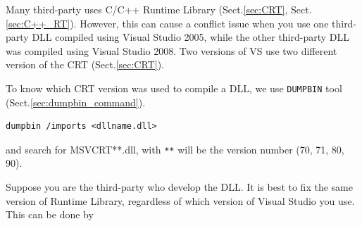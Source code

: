 Many third-party uses C/C++ Runtime Library (Sect.\ref{sec:CRT},
Sect.\ref{sec:C++_RT}). However, this can cause a conflict issue when you use
one third-party DLL compiled using Visual Studio 2005, while the other
third-party DLL was compiled using Visual Studio 2008. Two versions of VS use
two different version of the CRT (Sect.\ref{sec:CRT}).

To know which CRT version was used to compile a DLL, we use \verb!DUMPBIN! tool (Sect.\ref{sec:dumpbin_command}). 
\begin{verbatim}
dumpbin /imports <dllname.dll>
\end{verbatim}
and search for MSVCRT**.dll, with \verb!**! will be the version number (70, 71, 80, 90). 


Suppose you are the third-party who develop the DLL. It is best to fix the same 
version of Runtime Library, regardless of which version of Visual Studio you use. 
This can be done by
